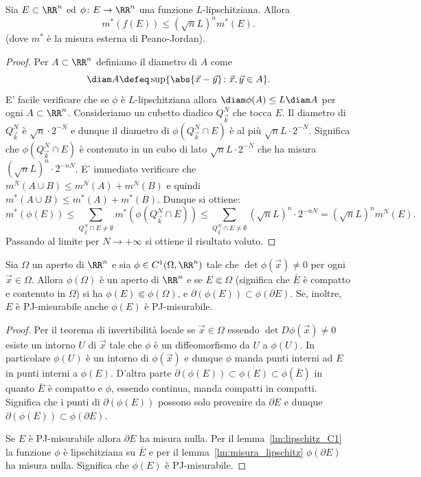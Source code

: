 \begin{lemma}
  \label{lm:misura_lipschitz}
Sia $E\subset \RR^n$ ed $\phi\colon E \to \RR^n$ 
una funzione $L$-lipschitziana.
Allora 
\[
  m^*(f(E)) \le (\sqrt n L)^n m^*(E).
\]
(dove $m^*$ è la misura esterna di Peano-Jordan).
\end{lemma}
\begin{proof}
Per $A\subset \RR^n$ definiamo il diametro di $A$ come
\[
 \diam A \defeq \sup\{\abs{\vec x - \vec y}\colon \vec x, \vec y \in A\}.
\]
E' facile verificare che se $\phi$ è $L$-lipschitziana allora
$\diam \phi(A) \le L \diam A$ per ogni $A\subset \RR^n$.
Consideriamo un cubetto diadico $Q^N_{\vec k}$ che tocca $E$.
Il diametro di $Q^N_{\vec k}$ è $\sqrt n \cdot 2^{-N}$ e dunque 
il diametro di $\phi(Q^N_{\vec k}\cap E)$ è al più $\sqrt n L \cdot 2^{-N}$.
Significa che $\phi(Q^N_{\vec k}\cap E)$ è contenuto 
in un cubo di lato $\sqrt n L \cdot 2^{-N}$ 
che ha misura $(\sqrt n L)^n \cdot 2^{-nN}$.
E' immediato verificare che $m^N(A\cup B)\le m^N(A) + m^N(B)$ 
e quindi $m^*(A\cup B)\le m^*(A) + m^*(B)$.
Dunque si ottiene:
\[
  m^*(\phi(E)) \le \sum_{Q^N_{\vec k}\cap E \neq \emptyset} m^*(\phi(Q^N_{\vec k}\cap E))
  \le \sum_{Q^N_{\vec k}\cap E \neq \emptyset} (\sqrt n L)^n \cdot 2^{-nN}
  = (\sqrt n L)^n m^N(E).
\]
Passando al limite per $N\to +\infty$ si ottiene il risultato voluto.
\end{proof}

\begin{lemma}
\label{lm:misurabile_C1}
Sia $\Omega$ un aperto di $\RR^n$ e sia $\phi\in C^1(\Omega,\RR^n)$
tale che $\det \phi(\vec x) \neq 0$ per ogni $\vec x \in \Omega$.
Allora $\phi(\Omega)$ è un aperto di $\RR^n$ e 
se $E\Subset \Omega$ 
(significa che $\bar E$ è compatto e contenuto in $\Omega$)
si ha $\phi(E)\Subset \phi(\Omega)$, 
e $\partial (\phi(E)) \subset \phi(\partial E)$. 
Se, inoltre, $E$ è PJ-misurabile anche $\phi(E)$ è PJ-misurabile.
\end{lemma}
%
\begin{proof}
Per il teorema di invertibilità locale 
se $\vec x \in \Omega$ essendo $\det D\phi(\vec x) \neq 0$ esiste un intorno $U$ di $\vec x$
tale che $\phi$ è un diffeomorfismo da $U$ a $\phi(U)$.
In particolare $\phi(U)$ è un intorno di $\phi(\vec x)$ 
e dunque $\phi$ manda punti interni ad $E$ 
in punti interni a $\phi(E)$.
D'altra parte $\partial(\phi(E))\subset \overline{\phi(E)} \subset \phi(\bar E)$
in quanto $\bar E$ è compatto e $\phi$, essendo continua, manda compatti in compatti.
Significa che i punti di $\partial(\phi(E))$ 
possono solo provenire da $\partial E$ 
e dunque $\partial(\phi(E)) \subset \phi(\partial E)$.

Se $E$ è PJ-misurabile allora $\partial E$ ha misura nulla.
Per il lemma~\ref{lm:lipschitz_C1} la funzione $\phi$ è lipschitziana su $\bar E$
e per il lemma~\ref{lm:misura_lipschitz} $\phi(\partial E)$ ha misura nulla.
Significa che $\phi(E)$ è PJ-misurabile.
\end{proof}

